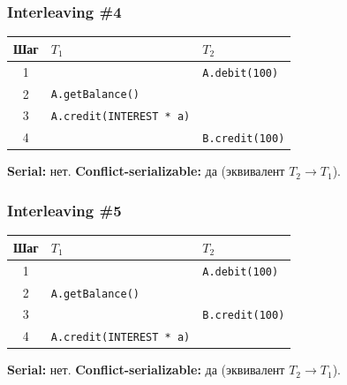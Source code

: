 \documentclass{beamer}
\begin{document}
\begin{frame}
\frametitle{Interleaving \#4}

\vspace{0.5em}
\normalsize
\begin{center}
\begin{tabular}{c|p{}|p{}}
\textbf{Шаг} & \textbf{$T_1$} & \textbf{$T_2$} \\ \hline
1 &  & \texttt{A.debit(100)} \\
2 & \texttt{A.getBalance()} &  \\
3 & \texttt{A.credit(INTEREST * a)} &  \\
4 &  & \texttt{B.credit(100)} \\
\end{tabular}
\end{center}

\vspace{0.4em}
\pause
\textbf{Serial:} нет. \quad
\pause
\textbf{Conflict-serializable:} да (эквивалент $T_2 \rightarrow T_1$).

\end{frame}

\begin{frame}
\frametitle{Interleaving \#5}

\vspace{0.5em}
\normalsize
\begin{center}
\begin{tabular}{c|p{}|p{}}
\textbf{Шаг} & \textbf{$T_1$} & \textbf{$T_2$} \\ \hline
1 &  & \texttt{A.debit(100)} \\
2 & \texttt{A.getBalance()} &  \\
3 &  & \texttt{B.credit(100)} \\
4 & \texttt{A.credit(INTEREST * a)} &  \\
\end{tabular}
\end{center}

\vspace{0.4em}
\pause
\textbf{Serial:} нет. \quad
\pause
\textbf{Conflict-serializable:} да (эквивалент $T_2 \rightarrow T_1$).

\end{frame}
\end{document}
